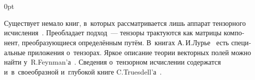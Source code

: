 \section*{\small \wordforbibliography}

\begin{changemargin}{\parindent}{0pt}
\fontsize{10}{12}\selectfont

\begin{otherlanguage}{russian}

Существует немало книг, в~которых рассматривается лишь аппарат тензорного исчисления~\cite{borisenkotarapov, mcconnell-tensoranalysis, rashevsky-riemanniangeometry, sokolnikov, schouten-tensoranalysis}. Преобладает  подход~--- тензоры трактуются как матрицы компонент, преобразующиеся определённым путём.
В~книгах А.\,И.\;Лурье~\cite{lurie-nonlinearelasticity, lurie-theoryofelasticity} есть специальные приложения о~тензорах.
Яркое описание теории векторных полей можно найти у~R.\:Feynman’а~\cite{feynman-lecturesonphysics}.
Сведения о~тензорном исчислении содержатся и~в~своеобразной и~глубокой книге C.\:Truesdell’а~\cite{truesdell-firstcourse}.

\end{otherlanguage}

\end{changemargin}
